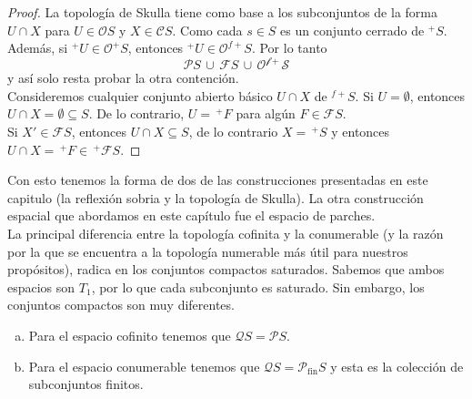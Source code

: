 \begin{proof}
    La topología de Skulla tiene como base a los subconjuntos de la forma $U\cap X$ para $U\in \mathcal{O}S$ y $X\in \mathcal{C}S$. Como cada $s\in S$ es un conjunto cerrado de $^+S$. Además, si $^+U\in \mathcal{O}^+S$, entonces $^+U\in \mathcal{O}^{f+}S$. Por lo tanto 
    \[
    \mathcal{P}S\,\cup\,\mathcal{F}S\,\cup \,\mathcal{O^{f+}S}
    \]
    y así solo resta probar la otra contención.\\

    Consideremos cualquier conjunto abierto básico $U\cap X$ de $^{f+}S$. Si $U=\emptyset$, entonces $U\cap X=\emptyset\subseteq S$. De lo contrario, $U=\,^+F$ para algún $F\in \mathcal{F}S$.\\
    
    Si $X'\in \mathcal{F}S$, entonces $U\cap X\subseteq S$, de lo contrario $X=\,^+S$ y entonces $U\cap X=\,^+F\in\, ^+\mathcal{F}S$.
\end{proof}

Con esto tenemos la forma de dos de las construcciones presentadas en este capitulo (la reflexión sobria y la topología de Skulla). La otra construcción espacial que abordamos en este capítulo fue el espacio de parches.\\

La principal diferencia entre la topología cofinita y la conumerable (y la razón por la que se encuentra a la topología numerable más útil para nuestros propósitos), radica en los conjuntos compactos saturados. Sabemos que ambos espacios son $T_1$, por lo que cada subconjunto es saturado. Sin embargo, los conjuntos compactos son muy diferentes.

\begin{lem}\label{Lema10.1.6}
    \begin{enumerate}[a)]
        \item Para el espacio cofinito tenemos que $\mathcal{Q}S=\mathcal{P}S$.
        \item Para el espacio conumerable tenemos que $\mathcal{Q}S=\mathcal{P}_{\mbox{fin}}S$ y esta es la colección de subconjuntos finitos.
    \end{enumerate}
\end{lem}

